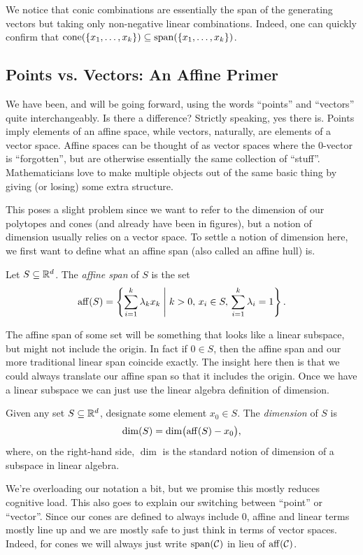\documentclass[12pt,oneside]{../../sfsuthesis}
\begin{document}
We notice that conic combinations are essentially the span of the generating vectors but taking only non-negative linear combinations.
Indeed, one can quickly confirm that \( \mathrm{cone}(\{x_1, \dots, x_k\}) \subseteq \operatorname{span}(\{x_1, \dots, x_k\}) \).

\subsection{Points vs. Vectors: An Affine Primer}
We have been, and will be going forward, using the words ``points'' and ``vectors'' quite interchangeably.
Is there a difference?
Strictly speaking, yes there is.
Points imply elements of an affine space, while vectors, naturally, are elements of a vector space.
Affine spaces can be thought of as vector spaces where the \( 0 \)-vector is ``forgotten'', but are otherwise essentially the same collection of ``stuff''.
Mathematicians love to make multiple objects out of the same basic thing by giving (or losing) some extra structure.

This poses a slight problem since we want to refer to the dimension of our polytopes and cones (and already have been in figures), but a notion of dimension usually relies on a vector space.
To settle a notion of dimension here, we first want to define what an affine span (also called an affine hull) is.
\begin{definition}\th\label{def:affineSpan}
    Let \( S \subseteq \mathbb{R}^d \).
    The \emph{affine span} of \( S \) is the set
    \[
        \operatorname{aff}(S) = \left\{ \sum_{i=1}^k \lambda_k x_k \; \middle| \; k > 0,\,  x_i \in S,\, \sum_{i=1}^k \lambda_i = 1 \right\}.
    \]
\end{definition}
The affine span of some set will be something that looks like a linear subspace, but might not include the origin.
In fact if \( 0 \in S \), then the affine span and our more traditional linear span coincide exactly.
The insight here then is that we could always translate our affine span so that it includes the origin.
Once we have a linear subspace we can just use the linear algebra definition of dimension.
\begin{definition}\th\label{def:affineDimension}
    Given any set \( S \subseteq \mathbb{R}^d \), designate some element \( x_0 \in S \).
    The \emph{dimension} of \( S \) is
    \[
        \dim(S) = \dim\bigl( \operatorname{aff}(S)-x_0 \bigr),
    \]
    where, on the right-hand side, \( \dim \) is the standard notion of dimension of a subspace in linear algebra.
\end{definition}
We're overloading our notation a bit, but we promise this mostly reduces cognitive load.
This also goes to explain our switching between ``point'' or ``vector''.
Since our cones are defined to always include \( 0 \), affine and linear terms mostly line up and we are mostly safe to just think in terms of vector spaces.
Indeed, for cones we will always just write \( \operatorname{span}(\mathcal{C}) \) in lieu of \( \operatorname{aff}(\mathcal{C}) \).
\end{document}
